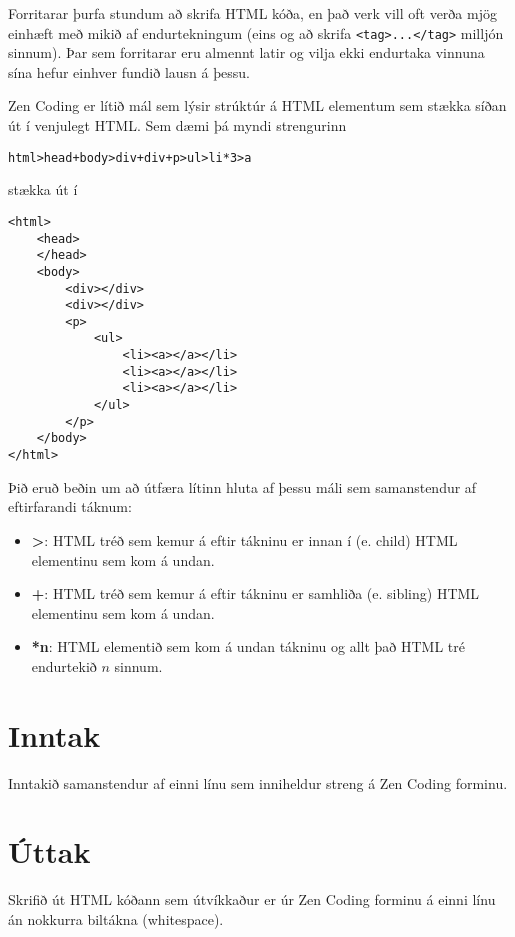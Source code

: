 

Forritarar þurfa stundum að skrifa HTML kóða, en það verk vill oft verða mjög
einhæft með mikið af endurtekningum (eins og að skrifa \texttt{<tag>...</tag>}
milljón sinnum). Þar sem forritarar eru almennt latir og vilja ekki endurtaka
vinnuna sína hefur einhver fundið lausn á þessu.

Zen Coding er lítið mál sem lýsir strúktúr á HTML elementum sem stækka síðan út
í venjulegt HTML. Sem dæmi þá myndi strengurinn
\begin{verbatim}
html>head+body>div+div+p>ul>li*3>a
\end{verbatim}
stækka út í
\begin{verbatim}
<html>
    <head>
    </head>
    <body>
        <div></div>
        <div></div>
        <p>
            <ul>
                <li><a></a></li>
                <li><a></a></li>
                <li><a></a></li>
            </ul>
        </p>
    </body>
</html>
\end{verbatim}

Þið eruð beðin um að útfæra lítinn hluta af þessu máli sem samanstendur af eftirfarandi táknum:
\begin{itemize}
    \item \textbf{>}: HTML tréð sem kemur á eftir tákninu er innan í (e. child) HTML elementinu sem kom á undan.
    \item \textbf{+}: HTML tréð sem kemur á eftir tákninu er samhliða (e. sibling) HTML elementinu sem kom á undan.
    \item \textbf{*n}: HTML elementið sem kom á undan tákninu og allt það HTML tré endurtekið $n$ sinnum.
\end{itemize}

\section*{Inntak}
Inntakið samanstendur af einni línu sem inniheldur streng á Zen Coding forminu.

\section*{Úttak}
Skrifið út HTML kóðann sem útvíkkaður er úr Zen Coding forminu á einni línu án
nokkurra biltákna (whitespace).
